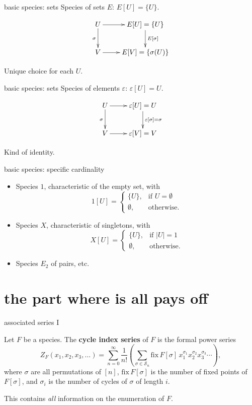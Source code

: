 \documentclass{beamer}
\begin{document}
\begin{frame}{basic species: sets}
  Species of sets $E$: $E[U] = \{U\}$.

  \[
    \xymatrix{U \ar[r] \ar[d]_\sigma & E[U] = \{U\} \ar[d]^{E[\sigma]} \\ V \ar[r] & E[V] = \{\sigma(U)\}}
  \]

  Unique choice for each $U$.
\end{frame}

\begin{frame}{basic species: sets}
  Species of elements $\varepsilon$: $\varepsilon[U] = U$.

  \[
    \xymatrix{U \ar[r] \ar[d]_\sigma & \varepsilon[U] = U \ar[d]^{\varepsilon[\sigma]=\sigma} \\ V \ar[r] & \varepsilon[V] = V}
  \]

  Kind of identity.
\end{frame}

\begin{frame}{basic species: specific cardinality}
  \begin{itemize}
    \item Species $1$, characteristic of the empty set, with
          \[
            1[U] = \begin{cases} \{U\}, & \text{if $U = \emptyset$}\\ \emptyset, & \text{otherwise.}\end{cases}
          \] \pause
    \item Species $X$, characteristic of singletons, with
          \[
            X[U] = \begin{cases} \{U\}, & \text{if $|U| = 1$}\\ \emptyset, & \text{otherwise.}\end{cases}
          \] \pause
    \item Species $E_2$ of pairs, etc.
  \end{itemize}
\end{frame}

\section{the part where is all pays off}

\begin{frame}{associated series I}
  \begin{definition}
    Let $F$ be a species. The \textbf{cycle index series} of $F$ is the formal power series
    \[
      Z_F(x_1, x_2, x_3, \ldots) = \sum_{n=0}^\infty \frac{1}{n!} \left(\sum_{\sigma \in \mathcal S_n} \mathrm{fix}\, F[\sigma]\, x_1^{\sigma_1} x_2^{\sigma_2} x_3^{\sigma_3}\cdots\right),
    \]
    where $\sigma$ are all permutations of $[n]$, $\mathrm{fix}\,F[\sigma]$ is the number of fixed points of $F[\sigma]$, and $\sigma_i$ is the number of cycles of $\sigma$ of length $i$.
  \end{definition}\pause
  This contains \emph{all} information on the enumeration of $F$.
\end{frame}
\end{document}
